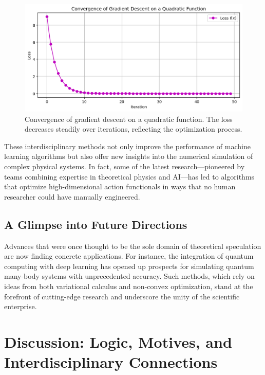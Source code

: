 \documentclass[11pt,a4paper]{article}
\begin{document}
\begin{figure}[ht]
    \centering
    \includegraphics[width=0.8\linewidth]{fig_grad_desc.png}
    \caption{Convergence of gradient descent on a quadratic function. The loss decreases steadily over iterations, reflecting the optimization process.}
    \label{fig:grad_desc}
\end{figure}

These interdisciplinary methods not only improve the performance of machine learning algorithms but also offer new insights into the numerical simulation of complex physical systems. In fact, some of the latest research—pioneered by teams combining expertise in theoretical physics and AI—has led to algorithms that optimize high-dimensional action functionals in ways that no human researcher could have manually engineered.

\subsection{A Glimpse into Future Directions}

Advances that were once thought to be the sole domain of theoretical speculation are now finding concrete applications. For instance, the integration of quantum computing with deep learning has opened up prospects for simulating quantum many-body systems with unprecedented accuracy. Such methods, which rely on ideas from both variational calculus and non-convex optimization, stand at the forefront of cutting-edge research and underscore the unity of the scientific enterprise.

\section{Discussion: Logic, Motives, and Interdisciplinary Connections}
\end{document}
